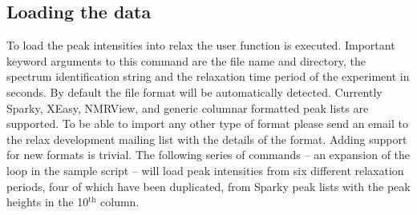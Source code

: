 
\subsection{Loading the data}

To load the peak intensities into relax the user function  is executed.  Important keyword arguments to this command are the file name and directory, the spectrum identification string and the relaxation time period of the experiment in seconds.  By default the file format will be automatically detected.  Currently Sparky, XEasy, NMRView, and generic columnar formatted peak lists are supported.  To be able to import any other type of format please send an email to the relax development mailing list with the details of the format.  Adding support for new formats is trivial.  The following series of commands -- an expansion of the  loop in the sample script -- will load peak intensities from six different relaxation periods, four of which have been duplicated, from Sparky peak lists with the peak heights in the 10$^\textrm{th}$ column.

